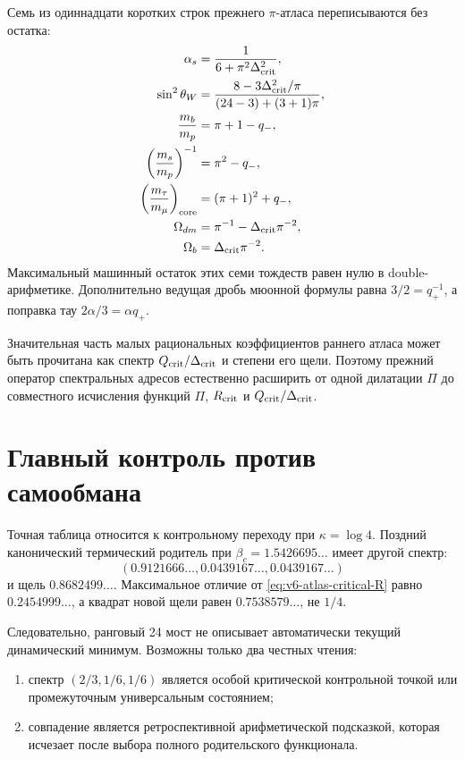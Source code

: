 Семь из одиннадцати коротких строк прежнего $\pi$-атласа переписываются
без остатка:
\begin{align}
 \alpha_s
 &=\frac1{6+\pi^2\Delta_{\rm crit}^2},\label{eq:v6-atlas-alpha-rewrite}\\
 \sin^2\theta_W
 &=\frac{8-3\Delta_{\rm crit}^2/\pi}
 {(24-3)+(3+1)\pi},\label{eq:v6-atlas-weinberg-rewrite}\\
 \frac{m_b}{m_p}&=\pi+1-q_-,\\
 \left(\frac{m_s}{m_p}\right)^{-1}&=\pi^2-q_-,\\
 \left(\frac{m_\tau}{m_\mu}\right)_{\rm core}
 &=(\pi+1)^2+q_-,\\
 \Omega_{dm}&=\pi^{-1}-\Delta_{\rm crit}\pi^{-2},\\
 \Omega_b&=\Delta_{\rm crit}\pi^{-2}.
 \label{eq:v6-atlas-seven-rewrites}
\end{align}
Максимальный машинный остаток этих семи тождеств равен нулю в double-
арифметике. Дополнительно ведущая дробь мюонной формулы равна
$3/2=q_+^{-1}$, а поправка тау $2\alpha/3=\alpha q_+$.

\begin{proposition}
Значительная часть малых рациональных коэффициентов раннего атласа может
быть прочитана как спектр $Q_{\rm crit}/\Delta_{\rm crit}$ и степени его
щели. Поэтому прежний оператор спектральных адресов естественно расширить
от одной дилатации $\Pi$ до совместного исчисления функций
$\Pi$, $R_{\rm crit}$ и $Q_{\rm crit}/\Delta_{\rm crit}$.
\end{proposition}

\section{Главный контроль против самообмана}

Точная таблица относится к контрольному переходу при $\kappa=\log4$.
Поздний канонический термический родитель при
$\beta_c=1.5426695\ldots$ имеет другой спектр:
\begin{equation}
 (0.9121666\ldots,0.0439167\ldots,0.0439167\ldots)
\end{equation}
и щель $0.8682499\ldots$. Максимальное отличие от
\eqref{eq:v6-atlas-critical-R} равно $0.2454999\ldots$, а квадрат новой
щели равен $0.7538579\ldots$, не $1/4$.

Следовательно, ранговый 24 мост не описывает автоматически текущий
динамический минимум. Возможны только два честных чтения:
\begin{enumerate}
 \item спектр $(2/3,1/6,1/6)$ является особой критической контрольной
 точкой или промежуточным универсальным состоянием;
 \item совпадение является ретроспективной арифметической подсказкой,
 которая исчезает после выбора полного родительского функционала.
\end{enumerate}

